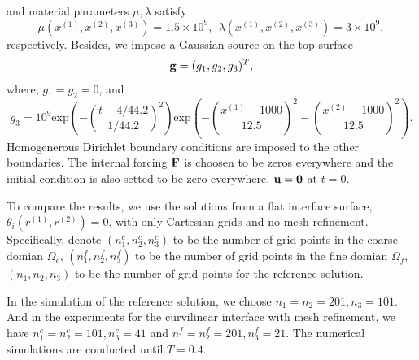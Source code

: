 and material parameters $\mu, \lambda$ satisfy
\begin{equation}
\mu(x^{(1)},x^{(2)},x^{(3)}) = 1.5\times 10^9,\ \ 
\lambda(x^{(1)},x^{(2)},x^{(3)})  = 3\times 10^9,
\end{equation}
respectively. Besides, we impose a Gaussian source on the top surface
\[{\bf g} = (g_1,g_2,g_3)^T ,\]
where, $g_1 = g_2 = 0$, and 
\[g_3 = 10^9 \text{exp}\left(-\left(\frac{t-4/44.2}{1/44.2}\right)^2\right)\text{exp}\left(-\left(\frac{x^{(1)}-1000}{12.5}\right)^2-\left(\frac{x^{(2)}-1000}{12.5}\right)^2\right).\]
Homogenerous Dirichlet boundary conditions are imposed to the other boundaries. The internal forcing ${\bf F}$ is choosen to be zeros everywhere and the initial condition is also setted to be zero everywhere, ${\bf u} = {\bf 0}$ at $t = 0$.

To compare the results, we use the solutions from a flat interface surface, $\theta_i(r^{(1)},r^{(2)}) = 0$, with only Cartesian grids and no mesh refinement. Specifically, denote $(n_1^c,n_2^c,n_3^c)$ to be the number of grid points in the coarse domian $\Omega_c$, $(n_1^f,n_2^f,n_3^f)$ to be the number of grid points in the fine domian $\Omega_f$, $(n_1,n_2,n_3)$ to be the number of grid points for the reference solution.

In the simulation of the reference solution, we choose $n_1 = n_2 = 201, n_3 = 101$. And in the experiments for the curvilinear interface with mesh refinement, we have $n_1^c = n_2^c = 101, n_3^c = 41$ and $n_1^f = n_2^f = 201, n_3^f = 21$. The numerical simulations are conducted until $T = 0.4$.

